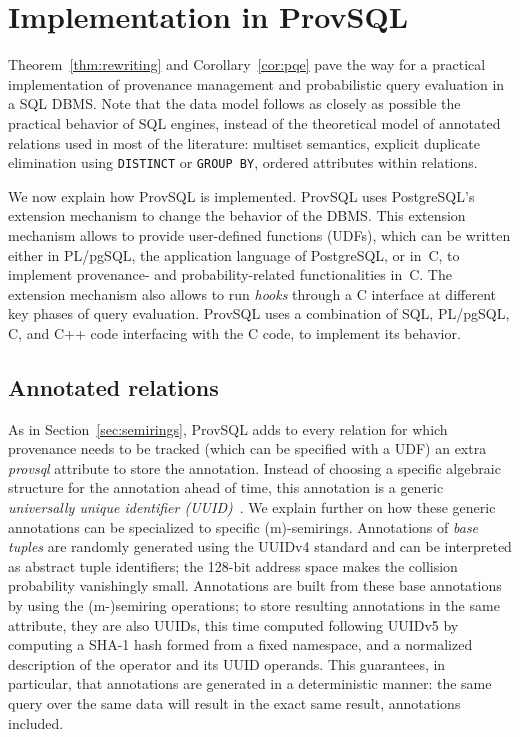 \section{Implementation in ProvSQL}\label{sec:implementation}

Theorem~\ref{thm:rewriting} and Corollary~\ref{cor:pqe} pave the way for
a practical implementation of provenance management and probabilistic
query evaluation in a SQL DBMS. Note that the data model follows as
closely as possible the practical behavior of SQL engines, instead of the
theoretical model of annotated relations used in most of the literature:
multiset semantics, explicit duplicate elimination using
\texttt{DISTINCT} or \texttt{GROUP BY},
ordered attributes within relations.

We now explain how ProvSQL is implemented. ProvSQL uses PostgreSQL's
extension mechanism to change the behavior of the DBMS. This extension mechanism
allows to provide user-defined functions (UDFs), which can be written
either in PL/pgSQL, the application language of PostgreSQL, or in~C, to
implement provenance- and probability-related functionalities in~C. The
extension
mechanism also allows to run \emph{hooks} through a C interface at
different key phases of query evaluation. ProvSQL uses a combination of
SQL, PL/pgSQL, C, and C++ code interfacing with the C code, to implement
its behavior.

\subsection{Annotated relations}
\label{sec:impl_relations}

As in Section~\ref{sec:semirings}, ProvSQL adds to every relation for
which provenance needs to be tracked (which can be specified with a UDF)
an extra \emph{provsql} attribute
to store the annotation. Instead of choosing a specific algebraic
structure for the annotation ahead of time, this annotation is a generic
\emph{universally unique identifier
	(UUID)}~\cite{DBLP:journals/rfc/rfc9562}. We explain further on how these
generic annotations can be specialized to specific (m)-semirings.
Annotations of \emph{base tuples} are randomly generated using the UUIDv4
standard and can be interpreted as abstract tuple identifiers; the
128-bit address space makes the collision probability vanishingly
small.
Annotations are built from these base annotations by using the
(m-)semiring operations; to store resulting annotations in the same
attribute, they are also UUIDs, this time computed following UUIDv5
by computing a \mbox{SHA-1} hash formed from a fixed namespace, and a
normalized description of the operator and its UUID operands. This
guarantees, in particular, that annotations are generated in a
deterministic manner: the same query over the same data will result in
the exact same result, annotations included.

